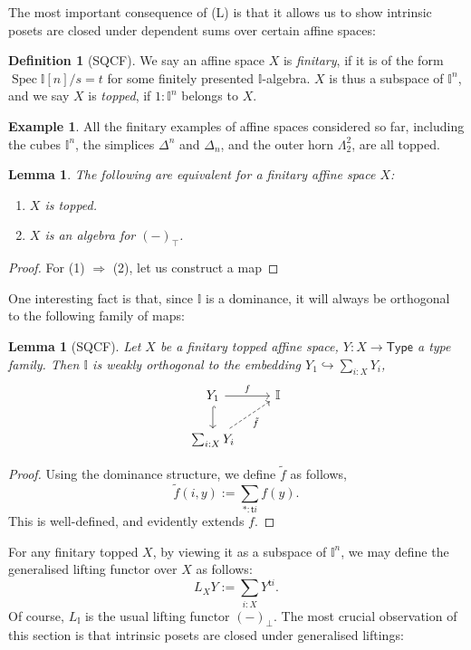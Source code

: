 \documentclass[12pt]{amsart}
\newtheorem{lemma}[theorem]{Lemma}
\theoremstyle{definition}
\newtheorem{example}[theorem]{Example}
\newtheorem{definition}[theorem]{Definition}
\newcommand{\mbb}[1]{\mathbb{#1}}
\newcommand{\I}{\mbb I}
\newcommand{\ms}[1]{\mathsf{#1}}
\newcommand{\qsi}[1]{\tilde{#1}}
\newcommand{\nt}{\Rightarrow}
\newcommand{\hook}{\hookrightarrow}
\newcommand{\prt}{_{\bot}}
\newcommand{\cprt}{_{\top}}
\newcommand{\tp}{\ms{Type}}
\newcommand{\spec}{\operatorname{Spec}}
\begin{document}
The most important consequence of (L) is that it allows us to show intrinsic posets are closed under dependent sums over certain affine spaces:

\begin{definition}[SQCF]
  We say an affine space $X$ is \emph{finitary}, if it is of the form $\spec\I[n]/s=t$ for some finitely presented $\I$-algebra. $X$ is thus a subspace of $\I^n$, and we say $X$ is \emph{topped}, if $1 : \I^n$ belongs to $X$.
\end{definition}

\begin{example}
  All the finitary examples of affine spaces considered so far, including the cubes $\I^n$, the simplices $\Delta^n$ and $\Delta_n$, and the outer horn $\Lambda^2_2$, are all topped.
\end{example}

\begin{lemma}
  The following are equivalent for a finitary affine space $X$:
  \begin{enumerate}
    \item $X$ is topped.
    \item $X$ is an algebra for $(-)\cprt$.
  \end{enumerate}
\end{lemma}
\begin{proof}
  For (1) $\nt$ (2), let us construct a map 
\end{proof}

One interesting fact is that, since $\I$ is a dominance, it will always be orthogonal to the following family of maps:

\begin{lemma}[SQCF]\label{lem:toppedfamilyortho}
  Let $X$ be a finitary topped affine space, $Y : X \to \tp$ a type family. Then $\I$ is weakly orthogonal to the embedding $Y_1 \hook \sum_{i : X}Y_i$,
  \[
  \begin{tikzcd}
    Y_1 \ar[d, hook] \ar[r, "f"] & \I \\ 
    \sum_{i : X} Y_i \ar[ur, dashed, "\qsi f"']
  \end{tikzcd}
  \]
\end{lemma}
\begin{proof}
  Using the dominance structure, we define $\qsi f$ as follows,
  \[ \qsi f(i,y) := \sum_{*:\ms ti} f(y). \]
  This is well-defined, and evidently extends $f$.
\end{proof}

For any finitary topped $X$, by viewing it as a subspace of $\I^n$, we may define the generalised lifting functor over $X$ as follows:
\[ L_XY := \sum_{i:X}Y^{\ms ti}. \]
Of course, $L_\I$ is the usual lifting functor $(-)\prt$. The most crucial observation of this section is that intrinsic posets are closed under generalised liftings:
\end{document}
